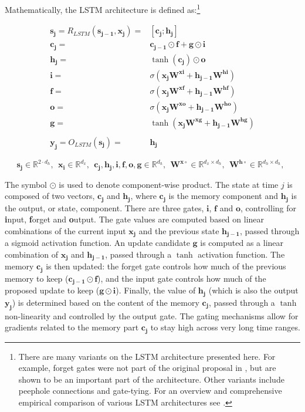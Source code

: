 \documentclass[jair,twoside,11pt,theapa]{article}
\newcommand{\m}[1]{\mathbf{#1}}%
\newcommand{\ygcomment}[1]{\textbf{[TODO: #1]}}
\renewcommand{\ygcomment}[1]{}
\begin{document}
{Mathematically, the LSTM architecture is defined as:\footnote{There are many variants on the LSTM architecture presented here.  
For example, forget gates were not part of the original proposal in \cite{hochreiter1997long}, but are shown
to be an important part of the architecture. Other variants include peephole connections and gate-tying.
For an overview and comprehensive empirical comparison of various LSTM architectures see \cite{greff2015lstm}.}

\begin{align*}
    \m{s_j} = R_{LSTM}(\m{s_{j-1}}, \m{x_j}) =& [\m{c_j};\m{h_j}] \\
    \m{c_j} =& \m{c_{j-1}} \odot \m{f}  + \m{g}\odot\m{i} \\
    \m{h_j} =& \tanh(\m{c_j}) \odot \m{o}            \\
    \m{i} =& \sigma(\m{x_j}\m{W^{xi}} + \m{h_{j-1}}\m{W^{hi}}) \\
    \m{f} =& \sigma(\m{x_j}\m{W^{xf}} + \m{h_{j-1}}\m{W^{hf}}) \\
    \m{o} =& \sigma(\m{x_j}\m{W^{xo}} + \m{h_{j-1}}\m{W^{ho}}) \\
    \m{g} =& \tanh(\m{x_j}\m{W^{xg}} + \m{h_{j-1}}\m{W^{hg}}) \\
    \\
    \m{y_j} = O_{LSTM}(\m{s_j}) =& \m{h_j} 
\end{align*}

\[
\m{s_j} \in \mathbb{R}^{2\cdot d_h}, \,\;
\m{x_i} \in \mathbb{R}^{d_x}, \,\;
\m{c_j},\m{h_j},\m{i},\m{f},\m{o},\m{g} \in \mathbb{R}^{d_h}, \,\;
\m{W^{x\circ}} \in \mathbb{R}^{d_x \times d_h}, \,\;
\m{W^{h\circ}} \in \mathbb{R}^{d_h \times d_h}, \,\;
\]

The symbol $\odot$ is used to denote component-wise product.
The state at time $j$ is composed of two vectors, $\m{c_j}$ and $\m{h_j}$, where $\m{c_j}$ is the memory component and $\m{h_j}$ is
the output, or state, component.
There are three gates, $\m{i}$, $\m{f}$ and $\m{o}$, controlling for \textbf{i}nput, \textbf{f}orget and \textbf{o}utput.
The gate values are computed based on linear combinations of the current input $\m{x_j}$ and the previous state $\m{h_{j-1}}$, passed
through a sigmoid activation function.  An update candidate $\m{g}$ is computed
as a linear combination of $\m{x_j}$ and $\m{h_{j-1}}$, passed through a $\tanh$
activation function.  The memory $\m{c_j}$ is then updated: the forget gate controls how much of the previous memory to keep ($\m{c_{j-1}}\odot\m{f}$), 
and the input gate controls how much of the proposed update to keep ($\m{g}\odot\m{i}$).  Finally, the value of $\m{h_j}$ (which is also the output $\m{y_j}$) is
determined based on the content of the memory $\m{c_j}$, passed through a $\tanh$ non-linearity and controlled by the output gate.
The gating mechanisms allow for gradients related to the memory part $\m{c_j}$ to stay high across very long time ranges.
\ygcomment{Explain better?}

}
\end{document}

